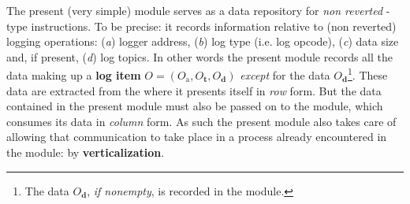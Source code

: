 The present (very simple) \logInfoMod{} module serves as a data repository for \emph{non reverted} -type instructions. To be precise: it records information relative to (non reverted) logging operations:
(\emph{a})
logger address,
(\emph{b})
log type (i.e. log opcode),
(\emph{c})
data size and, if present,
(\emph{d})
log topics.
In other words the present module records all the data making up a \textbf{log item} $O = (O_\text{a}, O_\textbf{t}, O_\textbf{d})$ \emph{except} for the data $O_\textbf{d}$\footnote{The data $O_\textbf{d}$, \emph{if nonempty}, is recorded in the \logDataMod{} module.}.  These data are extracted from the \hubMod{} where it presents itself in \emph{row} form. But the data contained in the present module must also be passed on to the \rlpTxnRcptMod{} module, which consumes its data in \emph{column} form. As such the present module also takes care of allowing that communication to take place in a process already encountered in the \userTxnDataMod{} module: by \textbf{verticalization}.
